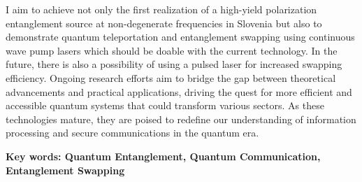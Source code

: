 \documentclass{article}
\theoremstyle{mytheoremstyle}
\theoremstyle{mytheoremstyle}
\theoremstyle{myproblemstyle}
\begin{document}
I aim to achieve not only the first realization of a high-yield polarization entanglement source at non-degenerate
frequencies in Slovenia but also to demonstrate quantum teleportation and entanglement swapping using
continuous wave pump lasers which should be doable with the current technology. In the future, there is
also a possibility of using a pulsed laser for increased swapping efficiency.
Ongoing research efforts aim to bridge the gap between theoretical advancements and practical applications,
driving the quest for more efficient and accessible quantum systems that could transform various sectors.
As these technologies mature, they are poised to redefine our understanding of information
processing and secure communications in the quantum era.
\par\textbf{Key words: Quantum Entanglement, Quantum Communication, Entanglement Swapping}
\end{document}
